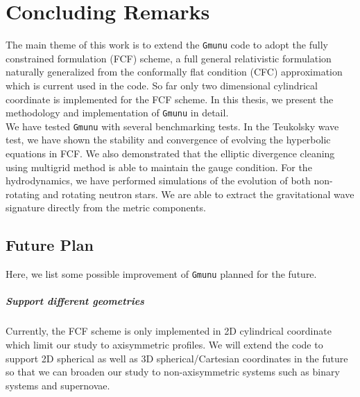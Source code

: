 
\chapter{Concluding Remarks}  %

\ifpdf
    \graphicspath{{Chapter5/Figs/PDF/}{Chapter5/Figs/}}
\else
    \graphicspath{{Chapter5/Figs/}}
\fi
The main theme of this work is to extend the \texttt{Gmunu} code to adopt the
fully constrained formulation (FCF) scheme,
a full general relativistic formulation naturally generalized from the conformally flat condition (CFC) approximation
which is current used in the code.
So far only two dimensional cylindrical coordinate is implemented for the FCF scheme.
In this thesis, we present the methodology and implementation of \texttt{Gmunu} in detail.\\
We have tested \texttt{Gmunu} with several benchmarking tests.
In the Teukolsky wave test, we have shown the stability and convergence of evolving the hyperbolic equations in FCF.
We also demonstrated that the elliptic divergence cleaning using multigrid method is able to maintain the gauge condition.
For the hydrodynamics,
we have performed simulations of the evolution of both non-rotating and rotating neutron stars.
We are able to extract the gravitational wave signature directly from the metric components.

\section*{Future Plan}
Here, we list some possible improvement of \texttt{Gmunu} planned for the future.

\paragraph{Support different geometries}
Currently, the FCF scheme is only implemented in 2D cylindrical coordinate
which limit our study to axisymmetric profiles.
We will extend the code to support 2D spherical
as well as 3D spherical/Cartesian coordinates in the future
so that we can broaden our study to non-axisymmetric systems
such as binary systems and supernovae.

